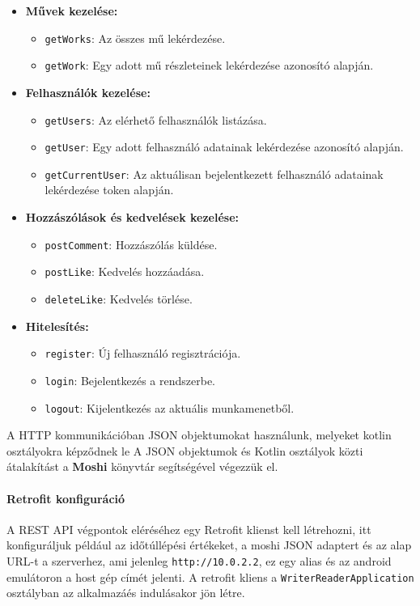 \begin{itemize}
    \item \textbf{Művek kezelése:}
    \begin{itemize}
        \item \texttt{getWorks}: Az összes mű lekérdezése.
        \item \texttt{getWork}: Egy adott mű részleteinek lekérdezése azonosító alapján.
    \end{itemize}
    \item \textbf{Felhasználók kezelése:}
    \begin{itemize}
        \item \texttt{getUsers}: Az elérhető felhasználók listázása.
        \item \texttt{getUser}: Egy adott felhasználó adatainak lekérdezése azonosító alapján.
        \item \texttt{getCurrentUser}: Az aktuálisan bejelentkezett felhasználó adatainak lekérdezése token alapján.
    \end{itemize}
    \item \textbf{Hozzászólások és kedvelések kezelése:}
    \begin{itemize}
        \item \texttt{postComment}: Hozzászólás küldése.
        \item \texttt{postLike}: Kedvelés hozzáadása.
        \item \texttt{deleteLike}: Kedvelés törlése.
    \end{itemize}
    \item \textbf{Hitelesítés:}
    \begin{itemize}
        \item \texttt{register}: Új felhasználó regisztrációja.
        \item \texttt{login}: Bejelentkezés a rendszerbe.
        \item \texttt{logout}: Kijelentkezés az aktuális munkamenetből.
    \end{itemize}
\end{itemize}

A HTTP kommunikációban JSON objektumokat használunk, melyeket kotlin osztályokra képződnek le
A JSON objektumok és Kotlin osztályok közti átalakítást a \textbf{Moshi} könyvtár segítségével végezzük el. 

\paragraph{Retrofit konfiguráció}
A REST API végpontok eléréséhez egy Retrofit klienst kell létrehozni, itt konfiguráljuk például az időtúllépési értékeket, a moshi JSON adaptert
és az alap URL-t a szerverhez, ami jelenleg \texttt{http://10.0.2.2}, ez egy alias és az android emulátoron a host gép címét jelenti.
A retrofit kliens a \texttt{WriterReaderApplication} osztályban az alkalmazáés indulásakor jön létre.

